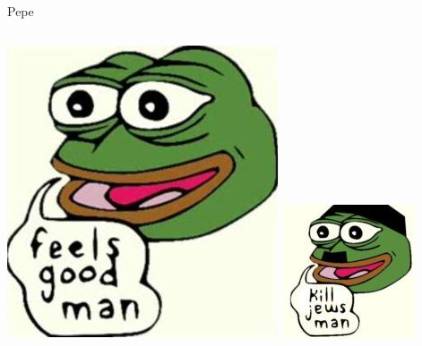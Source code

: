 \documentclass[nobackground,dvipsnames,table]{beamer}
\begin{document}
\begin{frame}{Pepe}
    \begin{columns}
            \includegraphics[width=\textwidth]{pepe}
            \includegraphics[width=\textwidth]{pepe-nazi}

\end{columns}
\end{frame}
\end{document}
